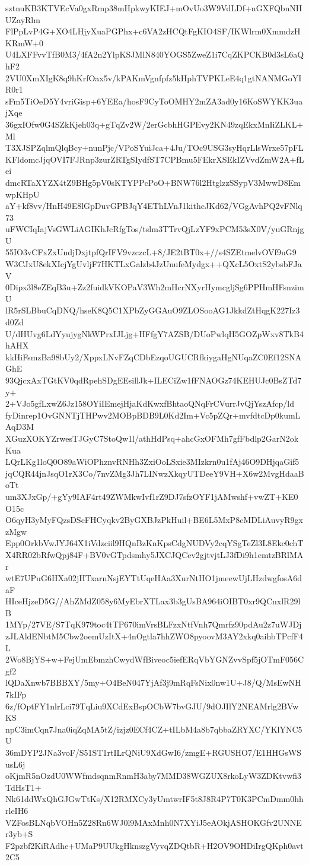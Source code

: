 sztnuKB3KTVEcVa0gxRmp38mHpkwyKIEJ+mOvUo3W9VdLDf+nGXFQbnNHUZayRlm
FlPpLvP4G+XO4LHjyXuaPGPhx+c6VA2zHCQtFgKIO4SF/IKWlrm0XmmdzHKRmW+0
U4LXFFvvTfB0M3/4fA2n2YlpKSJMlN840YOGS5ZweZ1i7CqZKPCKB0d3sL6aQhF2
2VU0XmXIgK8q9hKrfOax5v/kPAKmVgnfpfz5kHphTVPKLeE4q1gtNANMGoYIR0r1
sFm5TiOeD5Y4vriGisp+6YEEa/hosF9CyToOMHY2mZA3ad0y16KoSWYKK3uajXqe
36gxIOfw0G4SZkKjeh03q+gTqZv2W/2erGcbhHGPEvy2KN49zqEkxMnIiZLKL+Ml
T3XJSPZqlmQlqBcy+nunPjc/VPoSYuiJca+4Ju/TOc9USG3syHqrLlsWrxe57pFL
KFldomcJjqOVI7FJRnp3zurZRTgSIydfST7CPBmu5FEkrXSEkIZVvdZmW2A+fLei
dmcRTaXYZX4tZ9BHg5pV0sKTYPPcPoO+BNW76l2HtglzzSSypV3MwwD8EmwpKHpU
aY+kf8vv/HnH49E8lGpDuvGPBJqY4EThLVnJ1kithcJKd62/VGgAvhPQ2vFNlq73
uFWCIqIajVsGWLiAGIKhJcRfgTos/tslm3TTrvQjLzYF9xPCM53sX0V/yuGRnjgU
55IO3vCFxZxUndjDxjtpfQrIFV9vzczcL+8/JE2tBT0x+//s4SZEtmelvOVf9uG9
W3CJxU8ekXIcjYgUvljF7HKTLxGalzb4JzUnufeMydgx++QXcL5OxtS2ybsbFJaV
0Dipx3l8eZEqB3u+Zz2fuidkVKOPaV3Wh2mHcrNXyrHymcgljSg6PPHmHFsnzimU
lR5rSLBbuCqDNQ/hseK8Q5C1XPbZyGGAuO9ZLOSooAG1JkkdZtHqgK227Iz3d0Zd
U/dHUvg6LdYyujygNkWPrxIJLjg+HFfgY7AZSB/DUoPwlqH5GOZpWxv8TkB4hAHX
kkHiFsmzBa98bUy2/XppxLNvFZqCDbEzqoUGUCRfkiygaHgNUqaZC0Ef12SNAGhE
93QjcxAxTGtKV0qdRpehSDgEEsillJk+ILECiZw1fFNAOGz74KEHUJc0BsZTd7y+
2+VJo5gfLxwZ6Jz158OYiIEmejHjaKdKwxfBhtaoQNqFrCVurrJvQjYszAfcp/ld
fyDinrep1OvGNNTjTHPwv2MOBpBDB9L0Kd2Im+Vc5pZQr+mvfdtcDp0kumLAqD3M
XGuzXOKYZrwesTJGyC7StoQw1l/athHdPsq+ahcGxOFMh7gfFbdlp2GarN2okKua
LQrLKg1loQ0O89aWiOPhznvRNHh3ZxiOoLSxie3MIzkrn0u1fAj46O9DHjqaGif5
jqCQR44jnJsqO1rX3Co/7nvZMg3Jh7LINwzXkqyUTDeeY9VH+X6w2MvgHdaaBoTt
um3XJxGp/+gYy9IAF4rt49ZWMkwIvf1rZ9DJ7sfzOYF1jAMwshf+vwZT+KE0O15c
O6qyH3yMyFQzsDScFHCyqkv2ByGXBJzPkHuil+BE6L5MxP8cMDLiAuvyR9gxzMgw
Epp0OrkbVwJYJ64X1iVdzciil9HQnBzKnKpsCdgNUDVy2cqYSgTeZl3L8Ekc0chT
X4RR02bRfwQpj84F+BV0vGTpdsmhy5JXCJQCev2gjtvjtLJ3fDi9h1emtzBRlMAr
wtE7UPuG6HXa02jHTxarnNsjEYTtUqeHAa3XurNtHO1jmeewUjLHzdwgfosA6daF
HIceHjzeD5G//AhZMdZ058y6MyEbrXTLax3b3gUsBA964iOIBT0xr9QCnxlR29lB
1MYp/27VE/S7TqK979toc4tTP670imVrsBLFzxNtfVnh7Qmrfz90pdAu2z7uWJDj
zJLAldENbtM5Cbw2oemUzItX+4nOgtla7hhZWO8pyoovM3AY2xkq0aihbTPcfF4L
2Wo8BjYS+w+FejUmEbmzhCwydWfBiveoc5iefERqVbYGNZvvSpf5jOTmF056Cgf2
lQDaXnwb7BBBXY/5my+O4BeN047YjAf3j9mRqFsNix0nw1U+J8/Q/MsEwNH7kIFp
6z/fOptFY1nlrLci79TqLiu9XCdExBspOCbW7bvGJU/9dOJIlY2NEAMrlg2BVwKS
npC3imCqn7Jna0iqZqMA5tZ/izjz0ECf4CZ+tILbM4a8b7qbbaZRYXC/YKlYNC5U
36mDYP2JNa3voF/S51ST1rtILrQNiU9XdGwI6/zmgE+RGUSHO7/E1HHGsWSusL6j
oKjmR5nOzdU0WWfmdsqnmRnmH3aby7MMD38WGZUX8rkoLyW3ZDKtvwfi3TdHsT1+
Nk61ddWxQhGJGwTtKs/X12RMXCy3yUmtwrIF5t8J8R4P7T0K3PCmDmm0hhrleIH6
VZFosBLNqbVOHn5Z28Rn6WJ0l9MAxMnh0N7XYiJ5eAOkjASHOKGfv2UNNEr3yb+S
F2pzbf2KiRAdhe+UMaP9UUkgHknszgVyvqZDQtbR+H2OV9OHDiIrgQKph0avt2C5
